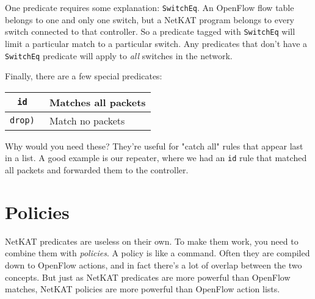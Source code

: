 One predicate requires some explanation: \lstinline{SwitchEq}.  
An OpenFlow flow table belongs to one and only one switch, but a NetKAT program belongs to every
switch connected to that controller.  
So a predicate tagged with \lstinline{SwitchEq} will limit a particular match to a particular switch.
Any predicates that don't have a \lstinline{SwitchEq} predicate will apply to \textit{all} switches in the network.

Finally, there are a few special predicates:

\bigskip
\begin{tabularx}{6in}{|c|X|}
\hline\hline
\tt{id} & Matches all packets
\\ \hline  
\tt{drop)} & Match no packets
\end{tabularx}

Why would you need these?  
They're useful for "catch all" rules that appear last in a list.
A good example is our repeater, where we had an \lstinline{id} rule that matched all packets and
forwarded them to the controller.

\section{Policies}

NetKAT predicates are useless on their own.  
To make them work, you need to combine them with \textit{policies}.
A policy is like a command.  
Often they are compiled down to OpenFlow actions, and in fact there's a lot of overlap between the two
concepts.
But just as NetKAT predicates are more powerful than OpenFlow matches, NetKAT policies are more
powerful than OpenFlow action lists.

